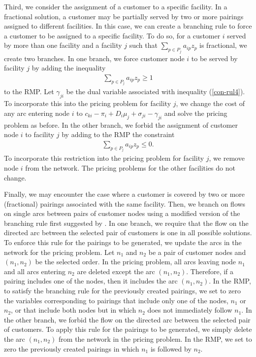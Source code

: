 \documentclass[11pt]{article}
\begin{document}
Third, we consider the assignment of a customer to a specific facility. In a fractional solution, 
a customer may be partially served by two or more pairings assigned to different facilities.  
In this case, we can create a branching rule to force a customer to be assigned to a specific facility.
To do so, for a customer $i$ served by more than one facility and a facility 
$j$ such that $\sum_{p \in P_j }a_{ip} z_{p}$ is fractional, we create two branches. 
In one branch, we force customer node 
$i$ to be served by facility $j$ by adding the inequality
\begin{eqnarray}
  \label{con-rul4}
  \sum_{p \in P_j}a_{ip}z_{p} \geq  1
\end{eqnarray}       
to the RMP. 
Let $\gamma_{ji}$ be the dual variable associated with inequality (\ref{con-rul4}).  To incorporate
this into the pricing problem for facility $j$, we change the cost of any arc entering node $i$
to $c_{ki}-\pi_{i}+D_i \mu_j +\sigma_{ji}-\gamma_{ji}$ and solve the pricing problem as before.
In the other branch, we forbid the assignment of customer node $i$ to facility $j$ by adding
to the RMP the constraint 
\begin{eqnarray}
  \sum_{p \in P_j }a_{ip}z_{p} \leq  0. %
\end{eqnarray}  
To incorporate this restriction into the pricing problem for facility $j$, we remove node $i$ from the network.   
The pricing problems for the other facilities do not change. 
 
Finally, we may encounter the case where a customer is covered by two or more (fractional) pairings
associated with the same facility.  Then, we branch on flows on single arcs
between pairs of customer nodes using a modified version of the \citet*{Ryan} branching rule
first suggested by \citet{Desrochers4}. In one branch, we require that
the flow on the directed arc between the selected pair of customers is one in all
possible solutions.  
To enforce this rule for the pairings to be generated, we update the arcs in the network 
for the pricing problem. 
Let $n_1$ and $n_2$ be a pair of customer nodes and
$(n_1,n_2)$ be the selected order. In the pricing problem, all arcs leaving  
node $n_1$ and all arcs entering $n_2$ are deleted except the arc $(n_1,n_2)$. 
Therefore, if a pairing includes one of the nodes, then it includes
the arc $(n_1,n_2)$.  
In the RMP, to satisfy the branching rule for the previously created pairings,
we set to zero the variables corresponding to pairings that include only one of the nodes, 
$n_1$ or $n_2$, or that include both nodes but in which $n_2$ does not immediately follow $n_1$.  
In the other branch, we forbid the flow on the directed arc 
between the selected pair of customers.
To apply this rule for the pairings to be generated, we simply delete the arc $(n_1,n_2)$ 
from the network in the pricing problem. In the RMP, we set to zero the previously 
created pairings in which $n_1$ is followed by $n_2$.
\end{document}
